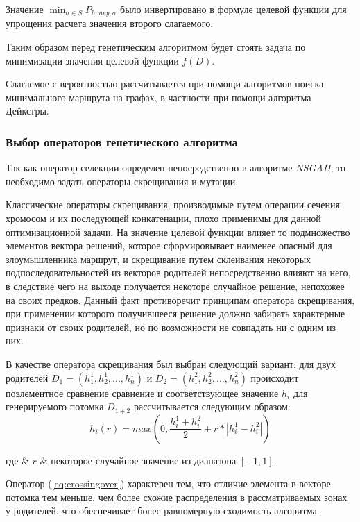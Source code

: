 Значение $\min_{\sigma \in S} P_{honey, \sigma}$ было инвертировано в формуле целевой функции для упрощения расчета значения второго слагаемого.

Таким образом перед генетическим алгоритмом будет стоять задача по минимизации значения целевой функции $f(D)$.

Слагаемое с вероятностью рассчитывается при помощи алгоритмов поиска минимального маршрута на графах, в частности при помощи алгоритма Дейкстры.

\subsubsection{Выбор операторов генетического алгоритма}\hspace*{\fill}

Так как оператор селекции определен непосредственно в алгоритме \textit{NSGAII}, то необходимо задать операторы скрещивания и мутации.

Классические операторы скрещивания, производимые путем операции сечения хромосом и их последующей конкатенации, плохо применимы для данной оптимизационной задачи. На значение целевой функции влияет то подмножество элементов вектора решений, которое сформировывает наименее опасный для злоумышленника маршрут, и скрещивание путем склеивания некоторых подпоследовательностей из векторов родителей непосредственно влияют на него, в следствие чего на выходе получается некоторе случайное решение, непохожее на своих предков. Данный факт противоречит принципам оператора скрещивания, при применении которого получившееся решение должно забирать характерные признаки от своих родителей, но по возможности не совпадать ни с одним из них.


В качестве оператора скрещивания был выбран следующий вариант: для двух родителей $D_1 = (h_1^1, h_2^1, ..., h_n^1)$ и $D_2 = (h_1^2, h_2^2, ..., h_n^2)$ происходит поэлементное сравнение сравнение и соответствующее значение $h_i$ для генерируемого потомка $D_{1+2}$ рассчитывается следующим образом:
\begin{equation}
\label{eq:crossingover}
h_i(r) = max(0, \frac{h_i^1 + h_i^2}{2} + r * |h_i^1 - h_i^2|)
\end{equation}
\begin{explanation}
где & $r$ & некоторое случайное значение из диапазона $[-1,1]$.
\end{explanation}

Оператор (\ref{eq:crossingover}) характерен тем, что отличие элемента в векторе потомка тем меньше, чем более схожие распределения в рассматриваемых зонах у родителей, что обеспечивает более равномерную сходимость алгоритма.

